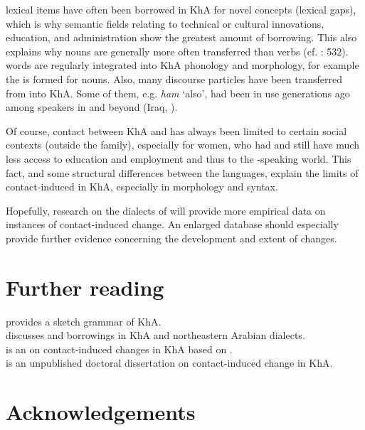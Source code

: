 \documentclass[output=paper,nonflat]{langsci/langscibook}
\begin{document}
 lexical items have often been borrowed in KhA for novel concepts (lexical gaps), which is why semantic fields relating to technical or cultural innovations, education, and administration show the greatest amount of  borrowing. This also explains why nouns are generally more often transferred than verbs (cf. \citealt{Lucas2015}: 532).  words are regularly integrated into KhA phonology and morphology, for example the   is formed for  nouns. Also, many discourse particles have been transferred from  into KhA. Some of them, e.g. \textit{ham} ‘also’, had been in use generations ago among  speakers in  and beyond (Iraq, ).

Of course, contact between KhA and  has always been limited to certain social contexts (outside the family), especially for women, who had and still have much less access to education and employment and thus to the -speaking world. This fact, and some structural differences between the languages, explain the limits of contact-induced  in KhA, especially in morphology and syntax.

Hopefully,  research on the dialects of  will provide more empirical data on instances of contact-induced change. An enlarged database should especially provide further evidence concerning the development and extent of  changes.

\section*{Further reading}


\citet{Ingham2011khuz} provides a sketch grammar of KhA.\\
\citet{Ingham2005} discusses  and  borrowings in KhA and northeastern Arabian dialects.\\
\citet{MatrasShabibi2007} is an  on contact-induced changes in KhA based on \citet{Shabibi2006}.\\
\citet{Shabibi2006} is an unpublished doctoral dissertation on contact-induced change in KhA.



\section*{Acknowledgements}
\end{document}
